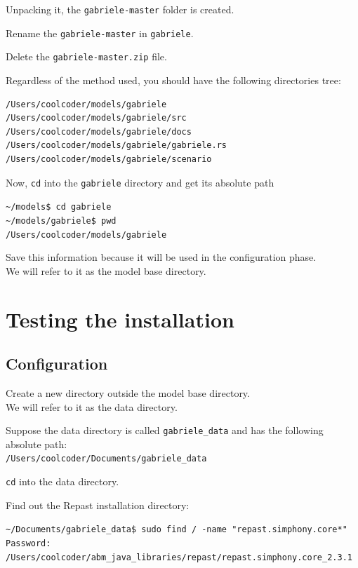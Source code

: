 \documentclass{book}
\begin{document}
Unpacking it, the \verb+gabriele-master+ folder is created.

Rename the \verb+gabriele-master+ in \verb+gabriele+.

Delete the \verb+gabriele-master.zip+ file.

\vskip1cm
Regardless of the method used, you should have the following directories tree: 

\begin{verbatim}
/Users/coolcoder/models/gabriele
/Users/coolcoder/models/gabriele/src
/Users/coolcoder/models/gabriele/docs
/Users/coolcoder/models/gabriele/gabriele.rs
/Users/coolcoder/models/gabriele/scenario
\end{verbatim}

Now, \verb+cd+ into the \verb+gabriele+ directory and get its absolute path  



\vskip2mm
\noindent\verb+~/models$ +\color{red}\verb+cd gabriele+ \color{black}\\
\verb+~/models/gabriele$ +\color{red}\verb+pwd+ \color{blue}\\
\verb+/Users/coolcoder/models/gabriele+
\color{black}
\vskip2mm


Save this information because it will be used in the configuration phase. \\ We will refer to it as the model base directory.

\section{Testing the installation}

\subsection{Configuration}

Create a new directory outside the model base directory. \\ We will refer to it as the data directory.

Suppose the data directory is called \verb+gabriele_data+ and has the following absolute path: \\
\verb+/Users/coolcoder/Documents/gabriele_data+

\verb+cd+ into the data directory.

Find out the Repast installation directory:

\vskip2mm
\noindent\verb+~/Documents/gabriele_data$ +\color{red}\verb+sudo find / -name "repast.simphony.core*"+ \color{black}
\verb+Password:+ \\ \color{blue}
\verb+/Users/coolcoder/abm_java_libraries/repast/repast.simphony.core_2.3.1 +\\
\color{black}
\vskip2mm
\end{document}
